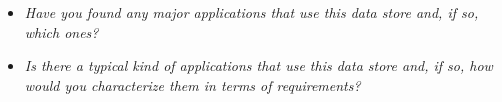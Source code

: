 
\begin{itemize}
\item \emph{Have you found any major applications that use this data store and, if so, which ones?}
\item \emph{Is there a typical kind of applications that use this data store and, if so, how would you characterize them in terms of requirements?}
\end{itemize}